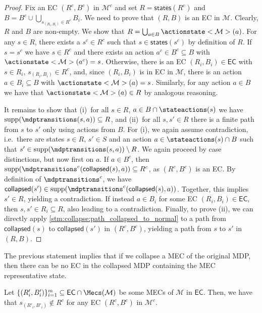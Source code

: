 \documentclass{article}
\newcommand{\unionSym}{\cup}
\newcommand{\unionBin}{\mathbin{\unionSym}}
\newcommand{\intersectionSym}{\cap}
\newcommand{\intersectionBin}{\mathbin{\intersectionSym}}
\newcommand{\UnionSym}{\bigcup}
\newcommand{\union}{\unionBin}
\newcommand{\intersection}{\intersectionBin}
\newcommand{\Union}{\UnionSym}
\newcommand{\MDP}{\mathcal{M}}
\newcommand{\States}{S}
\DeclareMathOperator{\support}{supp}
\newcommand{\eccollapsed}{\mathsf{collapsed}}
\newcommand{\ecstates}{\mathsf{states}}
\newcommand{\algoecs}{\mathsf{EC}}
\begin{document}
\begin{proof}
	Fix an EC $(R^c, B^c)$ in $\MDP^c$ and set $R = \ecstates(R^c)$ and $B = B^c \union \Union_{s_{(R_i, B_i)} \in R^c} B_i$.
	We need to prove that $(R, B)$ is an EC in $\MDP$.
	Clearly, $R$ and $B$ are non-empty.
	We show that $R = \Union_{a \in B} \actionstate<\MDP>(a)$.
	For any $s \in R$, there exists a $s^c \in R^c$ such that $s \in \ecstates(s^c)$ by definition of $R$.
	If $s = s^c$ we have $s \in R^c$ and there exists an action $a^c \in B^c \subseteq B$ with $\actionstate<\MDP>(a^c) = s$.
	Otherwise, there is an EC $(R_i, B_i) \in \algoecs$ with $s \in R_i$, $s_{(R_i, B_i)} \in R^c$, and, since $(R_i, B_i)$ is in EC in $\MDP$, there is an action $a \in B_i \subseteq B$ with $\actionstate<\MDP>(a) = s$.
	Similarly, for any action $a \in B$ we have that $\actionstate<\MDP>(a) \in R$ by analogous reasoning.

	It remains to show that (i)~for all $s \in R$, $a \in B \intersection \stateactions(s)$ we have $\support(\mdptransitions(s, a)) \subseteq R$, and (ii)~for all $s, s' \in R$ there is a finite path from $s$ to $s'$ only using actions from $B$.
	For (i), we again assume contradiction, i.e.\ there are states $s \in R$, $s' \in \States$ and an action $a \in \stateactions(s) \intersection B$ such that $s' \in \support(\mdptransitions(s, a)) \setminus R$.
	We again proceed by case distinctions, but now first on $a$.
	If $a \in B^c$, then $\support(\mdptransitions^c(\eccollapsed(s), a)) \subseteq R^c$, as $(R^c, B^c)$ is an EC.
	By definition of $\mdptransitions^c$, we have $\eccollapsed(s') \in \support(\mdptransitions^c(\eccollapsed(s), a))$.
	Together, this implies $s' \in R$, yielding a contradiction.
	If instead $a \in B_i$ for some EC $(R_i, B_i) \in \algoecs$, then $s, s' \in R_i \subseteq R$, also leading to a contradiction.
	Finally, to prove (ii), we can directly apply \cref{stm:collapse:path_collapsed_to_normal} to a path from $\eccollapsed(s)$ to $\eccollapsed(s')$ in $(R^c, B^c)$, yielding a path from $s$ to $s'$ in $(R, B)$. 
\end{proof}
The previous statement implies that if we collapse a MEC of the original MDP, then there can be no EC in the collapsed MDP containing the MEC representative state.
\begin{lemma} \label{stm:collapse:no_ecs}
	Let $\{(R'_i, B'_i)\}_{i=1}^m \subseteq \algoecs \intersection \Mecs(\MDP)$ be some MECs of $\MDP$ in $\algoecs$.
	Then, we have that $s_{(R'_i, B'_i)} \notin R^c$ for any EC $(R^c, B^c)$ in $\MDP^c$.
\end{lemma}
\end{document}
